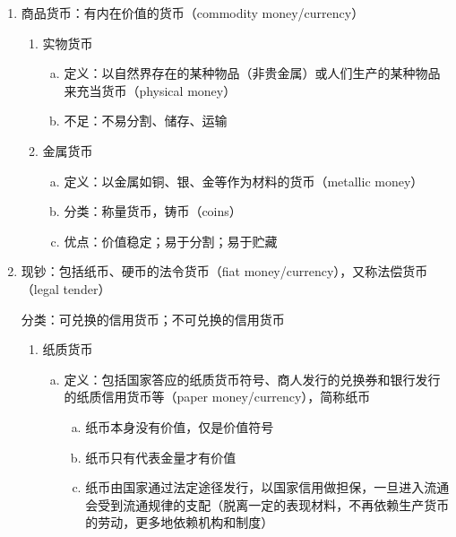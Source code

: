 \documentclass[12pt]{book}
\begin{document}
\begin{enumerate}[1.]
    \item 商品货币：有内在价值的货币（commodity money/currency）
          \begin{enumerate}[(1)]
              \item 实物货币
                    \begin{enumerate}[a.]
                        \item 定义：以自然界存在的某种物品（非贵金属）或人们生产的某种物品来充当货币（physical money）
                        \item 不足：不易分割、储存、运输
                    \end{enumerate}
              \item 金属货币
                    \begin{enumerate}[a.]
                        \item 定义：以金属如铜、银、金等作为材料的货币（metallic money）
                        \item 分类：称量货币，铸币（coins）
                        \item 优点：价值稳定；易于分割；易于贮藏
                    \end{enumerate}
          \end{enumerate}
    \item 现钞：包括纸币、硬币的法令货币（fiat money/currency），又称法偿货币（legal tender）
    \par 分类：可兑换的信用货币；不可兑换的信用货币
          \begin{enumerate}[(1)]
              \item 纸质货币
                    \begin{enumerate}[a.]
                        \item 定义：包括国家答应的纸质货币符号、商人发行的兑换券和银行发行的纸质信用货币等（paper money/currency），简称纸币
                              \begin{enumerate}[(a)]
                                  \item 纸币本身没有价值，仅是价值符号
                                  \item 纸币只有代表金量才有价值
                                  \item 纸币由国家通过法定途径发行，以国家信用做担保，一旦进入流通会受到流通规律的支配（脱离一定的表现材料，不再依赖生产货币的劳动，更多地依赖机构和制度）
                              \end{enumerate}

\end{enumerate}
\end{enumerate}
\end{enumerate}
\end{document}

